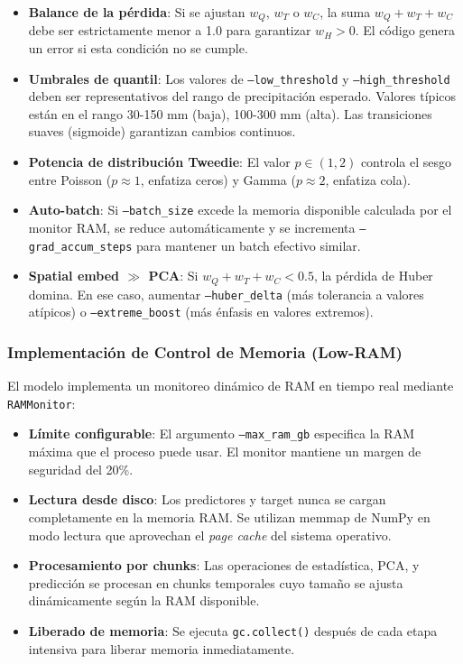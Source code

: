 \begin{itemize}
    
    \item \textbf{Balance de la pérdida}: Si se ajustan $w_Q$, $w_T$ o $w_C$, la suma $w_Q + w_T + w_C$ debe ser estrictamente menor a 1.0 para garantizar $w_H > 0$. El código genera un error si esta condición no se cumple.
    
    \item \textbf{Umbrales de quantil}: Los valores de \texttt{--low\_threshold} y \texttt{--high\_threshold} deben ser representativos del rango de precipitación esperado. Valores típicos están en el rango 30-150 mm (baja), 100-300 mm (alta). Las transiciones suaves (sigmoide) garantizan cambios continuos.
    
    \item \textbf{Potencia de distribución Tweedie}: El valor $p \in (1, 2)$ controla el sesgo entre Poisson ($p \approx 1$, enfatiza ceros) y Gamma ($p \approx 2$, enfatiza cola).
    
    \item \textbf{Auto-batch}: Si \texttt{--batch\_size} excede la memoria disponible calculada por el monitor RAM, se reduce automáticamente y se incrementa \texttt{--grad\_accum\_steps} para mantener un batch efectivo similar. 
    
    \item \textbf{Spatial embed $\gg$ PCA}: Si $w_Q + w_T + w_C < 0.5$, la pérdida de Huber domina. En ese caso, aumentar \texttt{--huber\_delta} (más tolerancia a valores atípicos) o \texttt{--extreme\_boost} (más énfasis en valores extremos).
\end{itemize}

\subsubsection{Implementación de Control de Memoria (Low-RAM)}

El modelo implementa un monitoreo dinámico de RAM en tiempo real mediante \texttt{RAMMonitor}:

\begin{itemize}
    \item \textbf{Límite configurable}: El argumento \texttt{--max\_ram\_gb} especifica la RAM máxima que el proceso puede usar. El monitor mantiene un margen de seguridad del 20\%.
    
    \item \textbf{Lectura desde disco}: Los predictores y target nunca se cargan completamente en la memoria RAM. Se utilizan memmap de NumPy en modo lectura que aprovechan el \textit{page cache} del sistema operativo.
    
    \item \textbf{Procesamiento por chunks}: Las operaciones de estadística, PCA, y predicción se procesan en chunks temporales cuyo tamaño se ajusta dinámicamente según la RAM disponible.
    
    \item \textbf{Liberado de memoria}: Se ejecuta \texttt{gc.collect()} después de cada etapa intensiva para liberar memoria inmediatamente.
\end{itemize}


